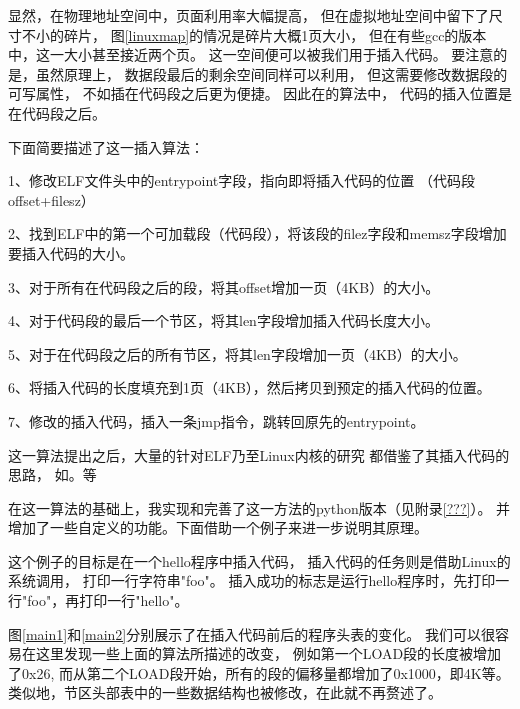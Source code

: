 显然，在物理地址空间中，页面利用率大幅提高，
但在虚拟地址空间中留下了尺寸不小的碎片，
图\ref{linuxmap}的情况是碎片大概1页大小，
但在有些gcc的版本中，这一大小甚至接近两个页。
这一空间便可以被我们用于插入代码。
要注意的是，虽然原理上，
数据段最后的剩余空间同样可以利用，
但这需要修改数据段的可写属性，
不如插在代码段之后更为便捷。
因此在\cite{silvio}的算法中，
代码的插入位置是在代码段之后。

下面简要描述了这一插入算法：

1、修改ELF文件头中的entrypoint字段，指向即将插入代码的位置
（代码段offset+filesz）

2、找到ELF中的第一个可加载段（代码段），将该段的filez字段和memsz字段增加
要插入代码的大小。

3、对于所有在代码段之后的段，将其offset增加一页（4KB）的大小。

4、对于代码段的最后一个节区，将其len字段增加插入代码长度大小。

5、对于在代码段之后的所有节区，将其len字段增加一页（4KB）的大小。

6、将插入代码的长度填充到1页（4KB），然后拷贝到预定的插入代码的位置。

7、修改的插入代码，插入一条jmp指令，跳转回原先的entrypoint。

这一算法提出之后，大量的针对ELF乃至Linux内核的研究
都借鉴了其插入代码的思路，
如\cite{simple,prototype,subversive,cerberus,shared}。等

在这一算法的基础上，我实现和完善了这一方法的python版本（见附录\ref{???}）。
并增加了一些自定义的功能。下面借助一个例子来进一步说明其原理。

这个例子的目标是在一个hello程序中插入代码，
插入代码的任务则是借助Linux的系统调用，
打印一行字符串"foo"。
插入成功的标志是运行hello程序时，先打印一行"foo"，再打印一行"hello"。

图\ref{main1}和\ref{main2}分别展示了在插入代码前后的程序头表的变化。
我们可以很容易在这里发现一些上面的算法所描述的改变，
例如第一个LOAD段的长度被增加了0x26,
而从第二个LOAD段开始，所有的段的偏移量都增加了0x1000，即4K等。
类似地，节区头部表中的一些数据结构也被修改，在此就不再赘述了。


